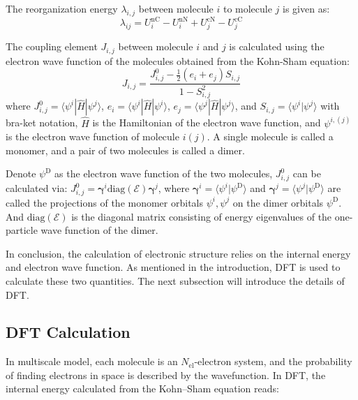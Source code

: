 \documentclass[letterpaper,12pt]{article}
\begin{document}
The reorganization energy $\lambda_{i,j}$ between molecule $i$ to molecule $j$ is given as:
\begin{equation}
    \lambda_{ij} = U_i^\text{nC} - U_i^\text{nN} + U_j^\text{cN} - U_j^\text{cC}
\end{equation}

The coupling element $J_{i,j}$ between molecule $i$ and $j$ is calculated \cite{baumeier_density_2010} using the electron wave function of the molecules obtained from the Kohn-Sham equation: 
\begin{equation}
    J_{i,j} = \frac{ J^0_{i,j}- \frac{1}{2}(e_i+e_j)S_{i,j} }{ 1- S_{i,j}^2 }
    \label{equ:JAB}
\end{equation}
where $J^0_{i,j} = \langle \psi^i | \hat{H} | \psi^j \rangle $, $e_i = \langle \psi^i | \hat{H} | \psi^i \rangle $, $e_j = \langle \psi^j | \hat{H} | \psi^j \rangle $, and $S_{i,j}=\langle \psi^i | \psi^j \rangle $ with bra-ket notation, $\hat{H}$ is the Hamiltonian of the electron wave function, and $\psi^{i,(j)}$ is the electron wave function of molecule $i(j)$. A single molecule is called a monomer, and a pair of two molecules is called a dimer.

Denote $\psi^\text{D}$ as the electron wave function of the two molecules,  $J^0_{i,j}$ can be calculated via:
$
    J^0_{i,j} = \mathbf{\gamma}^i \text{diag}(\mathcal{E}) \mathbf{\gamma}^j
$, 
where $\mathbf{\gamma}^i = \langle \psi^i | \psi^\text{D} \rangle$ and $\mathbf{\gamma}^j = \langle \psi^j | \psi^\text{D} \rangle$ are called the projections of the monomer orbitals $\psi^i, \psi^j$ on the dimer orbitals $\psi^\text{D}$. And $\text{diag}(\mathcal{E})$ is the diagonal matrix consisting of energy eigenvalues of the one-particle wave function of the dimer.

In conclusion, the calculation of electronic structure relies on the internal energy and electron wave function. As mentioned in the introduction, DFT is used to calculate these two quantities. The next subsection will introduce the details of DFT.

\subsection{DFT Calculation}
In multiscale model, each molecule is an $N_\text{el}$-electron system, and the probability of finding electrons in space is described by the wavefunction.
In DFT, the internal energy calculated from the Kohn–Sham equation \cite{kohn_self_1965} reads:
\end{document}
